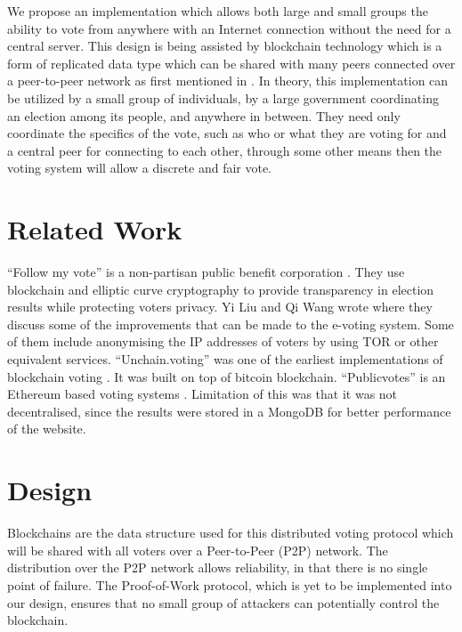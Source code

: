\documentclass[conference]{IEEEtran}
\begin{document}
We propose an implementation which allows both large and small groups the ability to vote from anywhere with an Internet connection without the need for a central server. This design is being assisted by blockchain technology which is a form of replicated data type which can be shared with many peers connected over a peer-to-peer network as first mentioned in \cite{Nakamoto}. In theory, this implementation can be utilized by a small group of individuals, by a large government coordinating an election among its people, and anywhere in between. They need only coordinate the specifics of the vote, such as who or what they are voting for and a central peer for connecting to each other, through some other means then the voting system will allow a discrete and fair vote.

\section{Related Work}
“Follow my vote” is a non-partisan public benefit corporation \cite{Followmyvote}. They use blockchain and elliptic curve cryptography to provide transparency in election results while protecting voters privacy. Yi Liu and Qi Wang wrote \cite{Liu} where they discuss some of the improvements that can be made to the e-voting system. Some of them include anonymising the IP addresses of voters by using TOR or other equivalent services. “Unchain.voting” was one of the earliest implementations of blockchain voting \cite{Unchain}. It was built on top of bitcoin blockchain. “Publicvotes” is an Ethereum based voting systems \cite{Publicvotes}. Limitation of this was that it was not decentralised, since the results were stored in a MongoDB for better performance of the website.

\section{Design}
Blockchains are the data structure used for this distributed voting protocol which will be shared with all voters over a Peer-to-Peer (P2P) network. The distribution over the P2P network allows reliability, in that there is no single point of failure. The Proof-of-Work protocol, which is yet to be implemented into our design, ensures that no small group of attackers can potentially control the blockchain. 
\end{document}
